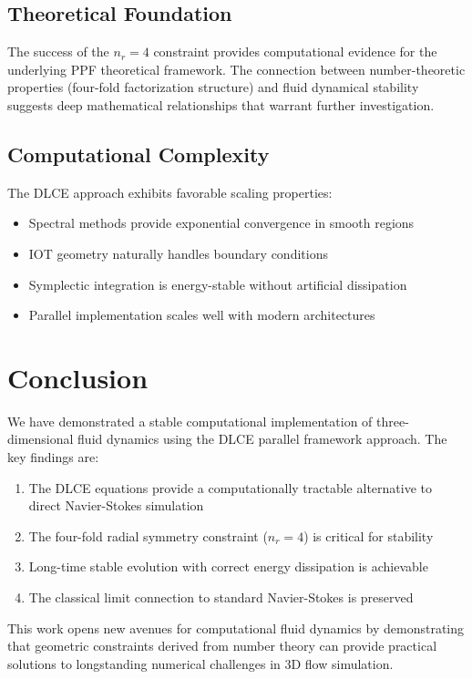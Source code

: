 \documentclass[conference]{IEEEtran}
\begin{document}
\subsection{Theoretical Foundation}

The success of the $n_r = 4$ constraint provides computational evidence for the underlying PPF theoretical framework. The connection between number-theoretic properties (four-fold factorization structure) and fluid dynamical stability suggests deep mathematical relationships that warrant further investigation.

\subsection{Computational Complexity}

The DLCE approach exhibits favorable scaling properties:
\begin{itemize}
\item Spectral methods provide exponential convergence in smooth regions
\item IOT geometry naturally handles boundary conditions
\item Symplectic integration is energy-stable without artificial dissipation
\item Parallel implementation scales well with modern architectures
\end{itemize}

\section{Conclusion}

We have demonstrated a stable computational implementation of three-dimensional fluid dynamics using the DLCE parallel framework approach. The key findings are:

\begin{enumerate}
\item The DLCE equations provide a computationally tractable alternative to direct Navier-Stokes simulation
\item The four-fold radial symmetry constraint ($n_r = 4$) is critical for stability
\item Long-time stable evolution with correct energy dissipation is achievable
\item The classical limit connection to standard Navier-Stokes is preserved
\end{enumerate}

This work opens new avenues for computational fluid dynamics by demonstrating that geometric constraints derived from number theory can provide practical solutions to longstanding numerical challenges in 3D flow simulation.
\end{document}
